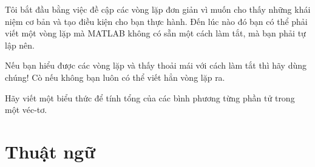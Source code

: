 \documentclass[12pt]{book}
\begin{document}
Tôi bắt đầu bằng việc đề cập các vòng lặp đơn giản vì muốn cho thấy
những khái niệm cơ bản và tạo điều kiện cho bạn thực hành. Đến lúc
nào đó bạn có thể phải viết một vòng lặp mà MATLAB không có sẵn
một cách làm tắt, mà bạn phải tự lập nên.

Nếu bạn hiểu được các vòng lặp và thấy thoải mái với cách làm tắt
thì hãy dùng chúng! Cò nếu không bạn luôn có thể viết hẳn vòng lặp
ra.

\begin{ex}
Hãy viết một biểu thức để tính tổng của các bình phương từng phần tử
trong một véc-tơ.
\end{ex}


\section{Thuật ngữ}
\end{document}

